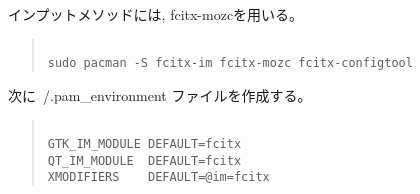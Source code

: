\documentclass[dvipdfmx]{jsarticle}
\begin{document}
インプットメソッドには, fcitx-mozcを用いる。

\begin{quote}
\begin{verbatim}

sudo pacman -S fcitx-im fcitx-mozc fcitx-configtool

\end{verbatim}
\end{quote}


次に~/.pam\_environment ファイルを作成する。

\begin{quote}
\begin{verbatim}

GTK_IM_MODULE DEFAULT=fcitx
QT_IM_MODULE  DEFAULT=fcitx
XMODIFIERS    DEFAULT=@im=fcitx

\end{verbatim}
\end{quote}
\end{document}
